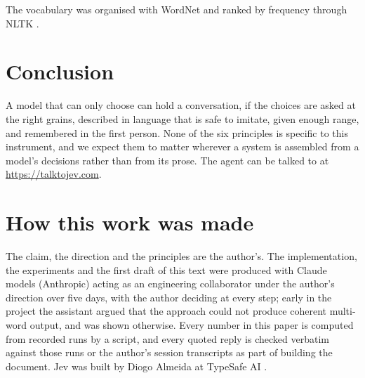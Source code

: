 \documentclass[10pt,twocolumn]{article}
\begin{document}
The vocabulary was organised with WordNet \citep{miller1995wordnet} and ranked by frequency
\citep{speer2022wordfreq} through NLTK \citep{bird2009nltk}.

\section{Conclusion}

A model that can only choose can hold a conversation, if the choices are asked at the right grains,
described in language that is safe to imitate, given enough range, and remembered in the first
person. None of the six principles is specific to this instrument, and we expect them to matter
wherever a system is assembled from a model's decisions rather than from its prose. The agent can be
talked to at \url{https://talktojev.com}.

\section*{How this work was made}

The claim, the direction and the principles are the author's. The implementation, the experiments
and the first draft of this text were produced with Claude models (Anthropic) acting as an
engineering collaborator under the author's direction over five days, with the author deciding at
every step; early in the project the assistant argued that the approach could not produce coherent
multi-word output, and was shown otherwise. Every number in this paper is computed from recorded
runs by a script, and every quoted reply is checked verbatim against those runs or the author's
session transcripts as part of building the document. Jev was built by Diogo Almeida at TypeSafe AI \citep{almeida2026jev}.
\end{document}
